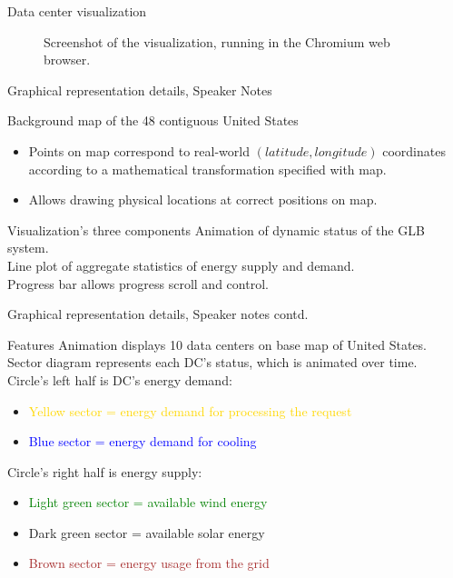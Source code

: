 \documentclass[xcolor=dvipsnames]{beamer}
\begin{document}
\begin{frame}{Data center visualization}

\begin{figure}
\centering
{}
\caption{Screenshot of the visualization, running in the Chromium web browser.}
\end{figure}

\end{frame}

\begin{frame}{Graphical representation details, Speaker Notes}

	\begin{block}{Background map of the 48 contiguous United States}
		\begin{itemize} 
	\item 	Points on map correspond to real-world $(latitude, longitude)$ coordinates according to a mathematical transformation specified with map. 
	\item 	Allows drawing physical locations at correct positions on map.
		\end{itemize}
	\end{block}
\vspace{-3mm}
	\begin{block}{Visualization's three components}
	Animation of dynamic status of the GLB system. \\
	Line plot of aggregate statistics of energy supply and demand. \\  
	Progress bar allows progress scroll and control.
	\end{block}
\end{frame}

\begin{frame}{Graphical representation details, Speaker notes contd.}
	\begin{block}{Features}
	Animation displays 10 data centers on base map of United States. \\
	Sector diagram represents each DC's status, which is animated over time. \\
	Circle's left half is DC's energy demand: 
		\begin{itemize}
		\item{\textcolor{gold}{Yellow sector = energy demand for processing the request}}
		\item{\textcolor{blue}{Blue sector = energy demand for cooling} }
		\end{itemize}
	Circle's right half is energy supply: 
		\begin{itemize}
		\item{\textcolor{green}{Light green sector = available wind energy}}
		\item{\textcolor{dgreen}{Dark green sector = available solar energy}}
		\item{\textcolor{brown}{Brown sector = energy usage from the grid}}
		\end{itemize} 
           \end{block} 
\end{frame}
\end{document}

